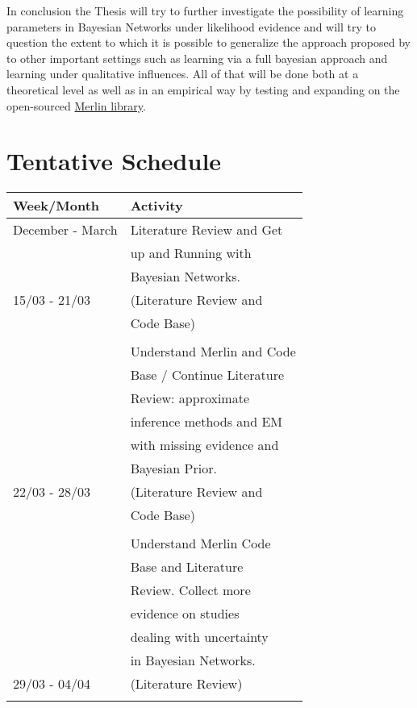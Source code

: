 \documentclass[a4paper]{article}
\begin{document}
In conclusion the Thesis will try to further investigate the
possibility of learning parameters in Bayesian Networks under
likelihood evidence and will try to question the extent to which it
is possible to generalize the approach proposed by
\cite{Wasserkrug_all} to other important settings such as learning via
a full bayesian approach and learning under qualitative
influences. All of that will be done both at a theoretical level as
well as in an empirical way by testing and expanding on the
open-sourced \href{https://github.com/radum2275/merlin}{Merlin library}.

\section{Tentative Schedule}
\label{sec:org63f1b0f}

\begin{center}
\begin{tabular}{|l|l|}
\hline
Week/Month & Activity \\
\hline
December - March & Literature Review and Get \\
 & up and Running with \\
 & Bayesian Networks. \\
\hline
15/03 - 21/03 & (Literature Review and \\
 & Code Base) \\
 & \\
 & Understand Merlin and Code \\
 & Base / Continue Literature \\
 & Review: approximate \\
 & inference methods and EM \\
 & with missing evidence and \\
 & Bayesian Prior. \\
\hline
22/03 - 28/03 & (Literature Review and \\
 & Code Base) \\
 & \\
 & Understand Merlin Code \\
 & Base and Literature \\
 & Review. Collect more \\
 & evidence on studies \\
 & dealing with uncertainty \\
 & in Bayesian Networks. \\
\hline
29/03 - 04/04 & (Literature Review) \\
 & \\

\end{tabular}
\end{center}
\end{document}
